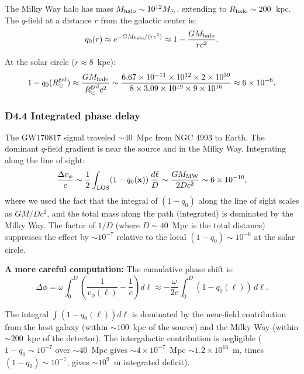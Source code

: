 \documentclass[reprint]{revtex4-2}
\begin{document}
The Milky Way halo has mass $M_{\rm halo} \sim 10^{12} M_\odot$, extending to $R_{\rm halo} \sim 200$~kpc. The $q$-field at a distance $r$ from the galactic center is:
\begin{equation}
q_0(r) \approx e^{-GM_{\rm halo}/(r c^2)} \approx 1 - \frac{GM_{\rm halo}}{r c^2}.
\end{equation}

At the solar circle ($r \approx 8$~kpc):
\begin{equation}
1 - q_0(R_\odot^{\rm gal}) \approx \frac{GM_{\rm halo}}{R_\odot^{\rm gal} c^2} \sim \frac{6.67\times 10^{-11}\times 10^{12}\times 2\times 10^{30}}{8\times 3.09\times 10^{19}\times 9\times 10^{16}} \approx 6\times 10^{-6}.
\end{equation}

\subsubsection{D4.4 Integrated phase delay}

The GW170817 signal traveled $\sim 40$~Mpc from NGC 4993 to Earth. The dominant $q$-field gradient is near the source and in the Milky Way. Integrating along the line of sight:
\begin{equation}
\frac{\Delta v_\phi}{c} \sim \frac{1}{2}\int_{\rm LOS} (1-q_0(\mathbf{x}))\,\frac{d\ell}{D} \sim \frac{GM_{\rm MW}}{2D c^2} \sim 6\times 10^{-10},
\label{eq:gw170817_correction}
\end{equation}
where we used the fact that the integral of $(1-q_0)$ along the line of sight scales as $GM/D c^2$, and the total mass along the path (integrated) is dominated by the Milky Way. The factor of $1/D$ (where $D \sim 40$~Mpc is the total distance) suppresses the effect by $\sim 10^{-7}$ relative to the local $(1-q_0) \sim 10^{-6}$ at the solar circle.

\textbf{A more careful computation:} The cumulative phase shift is:
\begin{equation}
\Delta\phi = \omega\int_0^D \left(\frac{1}{v_\phi(\ell)} - \frac{1}{c}\right)d\ell \approx -\frac{\omega}{2c}\int_0^D (1-q_0(\ell))\,d\ell.
\end{equation}

The integral $\int (1-q_0(\ell))d\ell$ is dominated by the near-field contribution from the host galaxy (within $\sim 100$~kpc of the source) and the Milky Way (within $\sim 200$~kpc of the detector). The intergalactic contribution is negligible ($1-q_0 \sim 10^{-7}$ over $\sim 40$~Mpc gives $\sim 4\times 10^{-7}$~Mpc $\sim 1.2\times 10^{16}$~m, times $(1-q_0) \sim 10^{-7}$, gives $\sim 10^9$~m integrated deficit).
\end{document}
